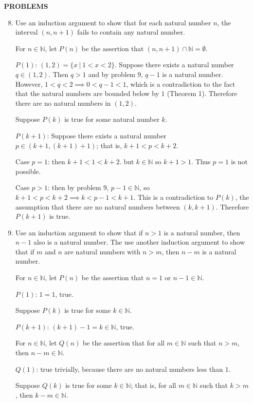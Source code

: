 \begin{center}
	\textbf{PROBLEMS}
\end{center}
\begin{enumerate}
	\setcounter{enumi}{7}
	\item Use an induction argument to show that for each natural number $n$, the interval $(n, n+1)$ fails to contain any natural number.\par
	For $n \in \mathbb{N}$, let $P(n)$ be the assertion that $(n, n+1) \cap \mathbb{N} = \emptyset$.\par
	$P(1)$: $(1, 2)=\{x\ |\ 1<x<2\}$. Suppose there exists a natural number $q \in (1, 2)$. Then $q>1$ and by problem 9, $q-1$ is a natural number. 
	However, $1<q<2 \implies 0<q-1<1$, which is a contradiction to the fact that the natural numbers are bounded below by $1$ (Theorem 1). Therefore there are no natural numbers in $(1, 2)$.\par
	Suppose $P(k)$ is true for some natural number $k$.\par
	$P(k+1)$: Suppose there exists a natural number $p \in (k+1, (k+1)+1)$; that is, $k+1<p<k+2$.\par
	Case $p=1$: then $k+1<1<k+2$. but $k \in \mathbb{N}$ so $k+1 >1$. Thus $p=1$ is not possible.\par
	Case $p>1$: then by problem 9, $p-1 \in \mathbb{N}$, so $k+1<p<k+2 \implies k<p-1<k+1$. This is a contradiction to $P(k)$, the assumption that there are no natural numbers between $(k,k+1)$.
	Therefore $P(k+1)$ is true.
	\item Use an induction argument to show that if $n>1$ is a natural number, then $n-1$ also is a natural number. The use another induction argument to show that if $m$ and $n$ are natural numbers with $n>m$, then $n-m$ is a natural number.\par
	For $n \in \mathbb{N}$, let $P(n)$ be the assertion that $n=1$ or $n-1 \in \mathbb{N}$.\par
	$P(1)$: $1=1$, true.\par
	Suppose $P(k)$ is true for some $k \in \mathbb{N}$.\par
	$P(k+1)$: $(k+1)-1 = k \in \mathbb{N}$, true.\par
	\medskip
	For $n \in \mathbb{N}$, let $Q(n)$ be the assertion that for all $m \in \mathbb{N}$ such that $n>m$, then $n-m \in \mathbb{N}$.\par
	$Q(1)$: true trivially, because there are no natural numbers less than $1$.\par
	Suppose $Q(k)$ is true for some $k \in \mathbb{N}$; that is, for all $m \in \mathbb{N}$ such that $k>m$, then $k-m \in \mathbb{N}.$\par

\end{enumerate}
